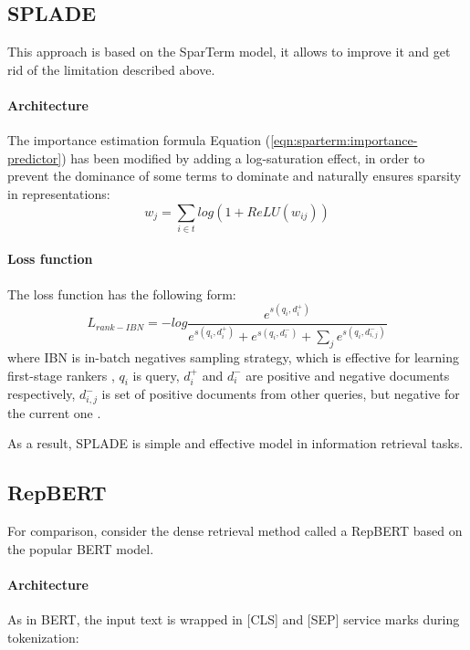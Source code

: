 \documentclass[
    twocolumn,
]{ceurart}
\begin{document}
    \subsection{SPLADE}

    This approach is based on the SparTerm model, it allows to improve it and get rid
    of the limitation described above.

    \paragraph{Architecture}
    The importance estimation formula Equation (\ref{eqn:sparterm:importance-predictor})
    has been modified by adding a log-saturation effect, in order to prevent the dominance
    of some terms to dominate and naturally ensures sparsity in representations:
    \begin{equation}
        w_j=\sum_{i \in t}log(1+ReLU(w_{ij}))
    \end{equation}

    \paragraph{Loss function}
    The loss function has the following form:
    \begin{equation}
        L_{rank-IBN}=-log
        \frac{
            e^{s(q_i,d_i^+)}
        }{
            e^{s(q_i,d_i^+)} +
            e^{s(q_i,d_i^-)} +
            \sum_j e^{s(q_i,d_{i,j}^-)}
        }
    \end{equation}
    where IBN is in-batch negatives sampling strategy, which is effective for learning first-stage
    rankers \cite{IBN1,IBN2,IBN3}, $q_i$ is query, $d_i^+$ and $d_i^-$ are positive and negative
    documents respectively, ${d_{i,j}^-}$ is set of positive documents from other queries,
    but negative for the current one \cite{SPLADE}.\\\par
    As a result, SPLADE is simple and effective model in information retrieval tasks.

    \subsection{RepBERT}

    For comparison, consider the dense retrieval method called a RepBERT based
    on the popular BERT model.

    \paragraph{Architecture}
    As in BERT\cite{BERT}, the input text is wrapped in [CLS] and [SEP] service marks
    during tokenization:
\end{document}
